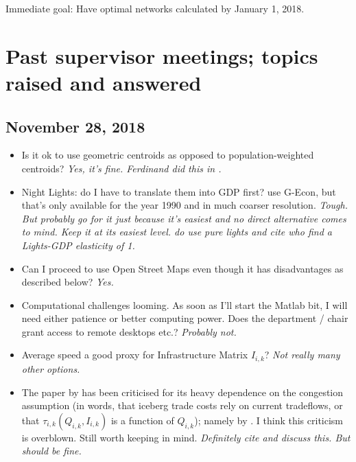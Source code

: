 \documentclass[11pt, oneside]{article}   	%
\begin{document}
Immediate goal: Have optimal networks calculated by January 1, 2018.

\section*{Past supervisor meetings; topics raised and answered}

\subsection*{November 28, 2018}

\begin{itemize}
\item Is it ok to use geometric centroids as opposed to population-weighted centroids? \textit{Yes, it's fine. Ferdinand did this in \cite{maurer_mice_2017}.}
\item Night Lights: do I have to translate them into GDP first? \cite{fajgelbaum_optimal_2017} use G-Econ, but that's only available for the year 1990 and in much coarser resolution. \textit{Tough. But probably go for it just because it's easiest and no direct alternative comes to mind. Keep it at its easiest level. \cite{kocornik-mina_flooded_2015} do use pure lights and cite \cite{henderson_measuring_2012} who find a Lights-GDP elasticity of 1.}
\item Can I proceed to use Open Street Maps even though it has disadvantages as described below? \textit{Yes.}
\item Computational challenges looming. As soon as I'll start the Matlab bit, I will need either patience or better computing power. Does the department / chair grant access to remote desktops etc.? \textit{Probably not.}
\item Average speed a good proxy for Infrastructure Matrix $I_{i,k}$? \textit{Not really many other options.}
\item The paper by \cite{fajgelbaum_optimal_2017} has been criticised for its heavy dependence on the congestion assumption (in words, that iceberg trade costs rely on current tradeflows, or that $\tau_{i,k}(Q_{i,k}, I_{i,k})$ is a function of $Q_{i,k}$); namely by \cite{allen_welfare_2016}. I think this criticism is overblown. Still worth keeping in mind. \textit{Definitely cite and discuss this. But should be fine.}

\end{itemize}


\vspace{\fill}

\begin{spacing}{1.0}
\setlength{\bibsep}{2.5pt plus 1.5ex}

\end{spacing}
\end{document}
